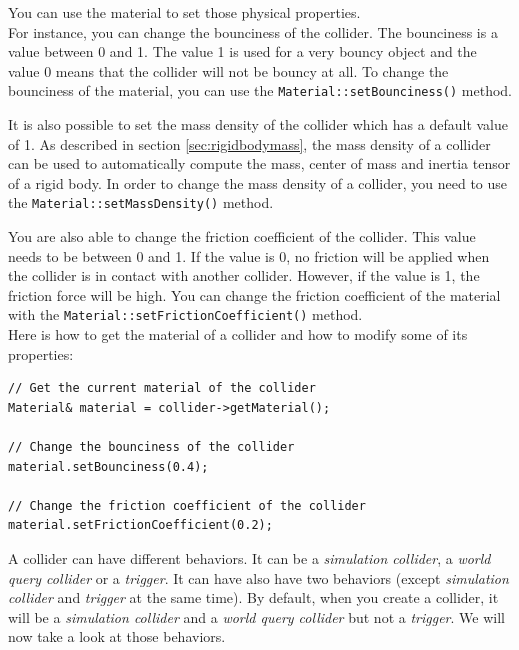 \documentclass[a4paper,12pt]{article}
\begin{document}
    You can use the material to set those physical properties. \\

    For instance, you can change the bounciness of the collider. The bounciness is a value between 0 and 1. The value 1 is used for
    a very bouncy object and the value 0 means that the collider will not be bouncy at all. To change the bounciness of the material,
    you can use the \texttt{Material::\allowbreak setBounciness()} method. \\

    \begin{sloppypar}
    It is also possible to set the mass density of the collider which has a default value of 1. As described in section \ref{sec:rigidbodymass}, the
    mass density of a collider can be used to automatically compute the mass, center of mass and inertia tensor of a rigid body. In order to change the
    mass density of a collider, you need to use the \texttt{Material::setMassDensity()} method. \\
    \end{sloppypar}

    You are also able to change the friction coefficient of the collider. This value needs to be between 0 and 1. If the value is 0,
    no friction will be applied when the collider is in contact with another collider. However, if the value is 1, the friction force will be high. You can
    change the friction coefficient of the material with the \texttt{Material::\allowbreak setFrictionCoefficient()} method. \\

    Here is how to get the material of a collider and how to modify some of its properties: \\

    \begin{lstlisting}
// Get the current material of the collider
Material& material = collider->getMaterial();

// Change the bounciness of the collider
material.setBounciness(0.4);

// Change the friction coefficient of the collider
material.setFrictionCoefficient(0.2);
  \end{lstlisting}

    \vspace{0.6cm}

    A collider can have different behaviors. It can be a \emph{simulation collider}, a \emph{world query collider} or a
    \emph{trigger}.  It can have also have two behaviors (except \emph{simulation collider} and \emph{trigger}
    at the same time). By default, when you create a collider, it will be a \emph{simulation collider} and a \emph{world query collider} but not a
    \emph{trigger}. We will now take a look at those behaviors. \\
\end{document}
